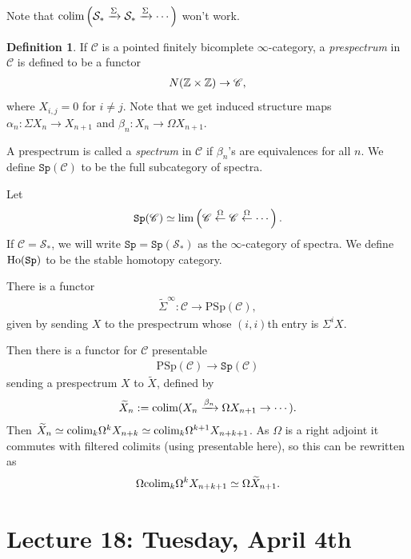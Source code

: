 \documentclass[12pt]{amsart}
\let\til\widetilde
\theoremstyle{definition}
\newtheorem{definition}[theorem]{Definition}
\providecommand{\Sp}{\texttt{Sp}}
\providecommand{\Sp}{\text{Sp}}
\providecommand{\PSp}{\text{PSp}}
\begin{document}
Note that $\text{colim} \left( \mathcal{S}_\ast \xrightarrow{\Sigma} \mathcal{S}_\ast \xrightarrow{\Sigma} \cdots \right)$ won't work.

\begin{definition} If $\mathscr{C}$ is a pointed finitely bicomplete $\infty$-category, a \textit{prespectrum} in $\mathscr{C}$ is defined to be a functor
\begin{align*}
    N(\mathbb{Z} \times\mathbb{Z}) \to \mathscr{C},
\end{align*}
where $X_{i,j} = 0$ for $i\ne j$. Note that we get induced structure maps $\alpha_n: \Sigma X_n \to X_{n+1}$ and $\beta_n : X_n \to \Omega X_{n+1}$.
\end{definition}

A prespectrum is called a \textit{spectrum} in $\mathscr{C}$ if $\beta_n$'s are equivalences for all $n$. We define $\Sp(\mathscr{C})$ to be the full subcategory of spectra.

Let
\begin{align*}
    \Sp(\mathscr{C}) \simeq \lim \left( \mathscr{C}\xfrom{\Omega} \mathscr{C} \xfrom{\Omega} \cdots \right).
\end{align*}
If $\mathscr{C} = \mathcal{S}_\ast$, we will write $\Sp = \Sp(\mathcal{S}_\ast)$ as the $\infty$-category of spectra. We define $\Ho(\Sp)$ to be the stable homotopy category.

There is a functor
\begin{align*}
    \til{\Sigma}^\infty : \mathscr{C} \to \PSp(\mathscr{C}),
\end{align*}
given by sending $X$ to the prespectrum whose $(i,i)$th entry is $\Sigma^i X$.

Then there is a functor for $\mathscr{C}$ presentable
\begin{align*}
    \PSp(\mathscr{C}) \to \Sp(\mathscr{C})
\end{align*}
sending a prespectrum $X$ to $\til{X}$, defined by
\begin{align*}
    \til{X}_n := \colim(X_n \xto{\beta_n} \Omega X_{n+1} \to \cdots ).
\end{align*}
Then $\til{X}_n \simeq \colim_k \Omega^k X_{n+k} \simeq \colim_k \Omega^{k+1} X_{n+k+1}$. As $\Omega$ is a right adjoint it commutes with filtered colimits (using presentable here), so this can be rewritten as
\begin{align*}
    \Omega \colim_k \Omega^k X_{n+k+1} \simeq \Omega \til{X}_{n+1}.
\end{align*}

\section{Lecture 18: Tuesday, April 4th}
\end{document}
